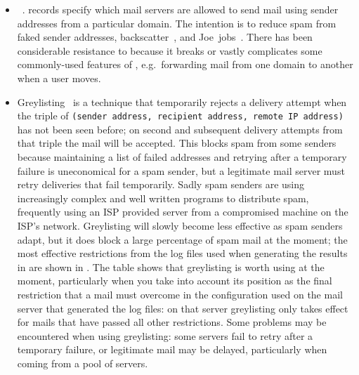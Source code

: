 \begin{itemize}

    \item {}~\cite{openspf}.   records specify
        which mail servers are allowed to send mail using sender addresses
        from a particular domain.  The intention is to reduce spam from
        faked sender addresses, backscatter~\cite{postfix-backscatter}, and
        Joe~jobs~.  There has been considerable resistance
        to  because it breaks or vastly complicates some
        commonly-used features of , e.g.\ forwarding mail
        from one domain to another when a user moves.

    \item Greylisting~\cite{greylisting} is a technique that temporarily
        rejects a delivery attempt when the triple of \newline{}
        \tab{}\texttt{(sender address, recipient address, remote IP
        address)}\newline{} has not been seen before; on second and
        subsequent delivery attempts from that triple the mail will be
        accepted.  This blocks spam from some senders because maintaining a
        list of failed addresses and retrying after a temporary failure is
        uneconomical for a spam sender, but a legitimate mail server must
        retry deliveries that fail temporarily.  Sadly spam senders are
        using increasingly complex and well written programs to distribute
        spam, frequently using an ISP provided  server from a
        compromised machine on the ISP's network.  Greylisting will slowly
        become less effective as spam senders adapt, but it does block a
        large percentage of spam mail at the moment; the most effective
        restrictions from the \numberOFlogFILES{} log files used when
        generating the results in  are shown in
        .  The table shows
        that greylisting is worth using at the moment, particularly when
        you take into account its position as the final restriction that a
        mail must overcome in the configuration used on the mail server
        that generated the log files: on that server greylisting only takes
        effect for mails that have passed all other restrictions.  Some
        problems may be encountered when using greylisting: some servers
        fail to retry after a temporary failure, or legitimate mail may be
        delayed, particularly when coming from a pool of servers.


\end{itemize}
